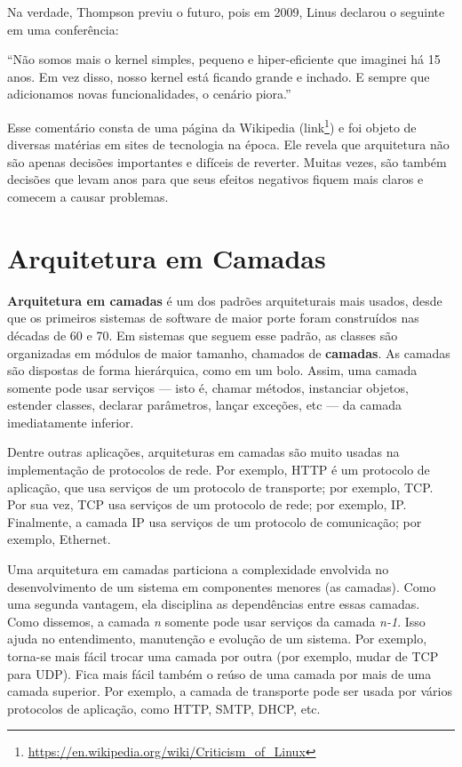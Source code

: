 \documentclass[
  11pt,
  twoside]{book}
\DeclareRobustCommand{\href}[2]{#2\footnote{\url{#1}}}
\renewenvironment{quote}{\centering \vspace{1.5ex} \begin{tcolorbox}[colback=backcolor, width=4.9in]}{\end{tcolorbox}}
\begin{document}
Na verdade, Thompson previu o futuro, pois em 2009, Linus declarou o
seguinte em uma conferência:

\begin{quote}
``Não somos mais o kernel simples, pequeno e hiper-eficiente que
imaginei há 15 anos. Em vez disso, nosso kernel está ficando grande e
inchado. E sempre que adicionamos novas funcionalidades, o cenário
piora.''
\end{quote}

Esse comentário consta de uma página da Wikipedia
(\href{https://en.wikipedia.org/wiki/Criticism_of_Linux}{link}) e foi
objeto de diversas matérias em sites de tecnologia na época. Ele revela
que arquitetura não são apenas decisões importantes e difíceis de
reverter. Muitas vezes, são também decisões que levam anos para que seus
efeitos negativos fiquem mais claros e comecem a causar problemas.

\hypertarget{arquitetura-em-camadas}{%
\section{Arquitetura em Camadas}\label{arquitetura-em-camadas}}


\textbf{Arquitetura em camadas} é um dos padrões arquiteturais mais
usados, desde que os primeiros sistemas de software de maior porte foram
construídos nas décadas de 60 e 70. Em sistemas que seguem esse padrão,
as classes são organizadas em módulos de maior tamanho, chamados de
\textbf{camadas}. As camadas são dispostas de forma hierárquica, como em
um bolo. Assim, uma camada somente pode usar serviços --- isto é, chamar
métodos, instanciar objetos, estender classes, declarar parâmetros,
lançar exceções, etc --- da camada imediatamente inferior.

Dentre outras aplicações, arquiteturas em camadas são muito usadas na
implementação de protocolos de rede. Por exemplo, HTTP é um protocolo de
aplicação, que usa serviços de um protocolo de transporte; por exemplo,
TCP. Por sua vez, TCP usa serviços de um protocolo de rede; por exemplo,
IP. Finalmente, a camada IP usa serviços de um protocolo de comunicação;
por exemplo, Ethernet.

Uma arquitetura em camadas particiona a complexidade envolvida no
desenvolvimento de um sistema em componentes menores (as camadas). Como
uma segunda vantagem, ela disciplina as dependências entre essas
camadas. Como dissemos, a camada \emph{n} somente pode usar serviços da
camada \emph{n-1}. Isso ajuda no entendimento, manutenção e evolução de
um sistema. Por exemplo, torna-se mais fácil trocar uma camada por outra
(por exemplo, mudar de TCP para UDP). Fica mais fácil também o reúso de
uma camada por mais de uma camada superior. Por exemplo, a camada de
transporte pode ser usada por vários protocolos de aplicação, como HTTP,
SMTP, DHCP, etc.
\end{document}
